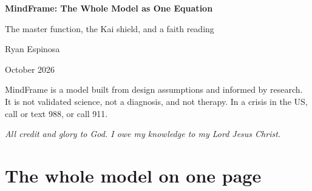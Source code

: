 \documentclass[10pt]{article}
\theoremstyle{remark}
\begin{document}
\begin{titlepage}
\centering
\vspace*{1.8in}
{\LARGE\bfseries MindFrame: The Whole Model as One Equation\par}
\vspace{0.25in}
{\large The master function, the Kai shield, and a faith reading\par}
\vspace{0.5in}
{\Large Ryan Espinosa\par}
\vspace{0.2in}
{\large October 2026\par}
\vfill
{\small MindFrame is a model built from design assumptions and informed by research. It is not validated science, not a diagnosis, and not therapy. In a crisis in the US, call or text 988, or call 911.\par}
\end{titlepage}

\thispagestyle{empty}
\vspace*{3in}
\begin{center}
\Large\itshape All credit and glory to God. I owe my knowledge to my Lord Jesus Christ.
\end{center}
\clearpage
\setcounter{page}{1}

\section{The whole model on one page}
\end{document}
